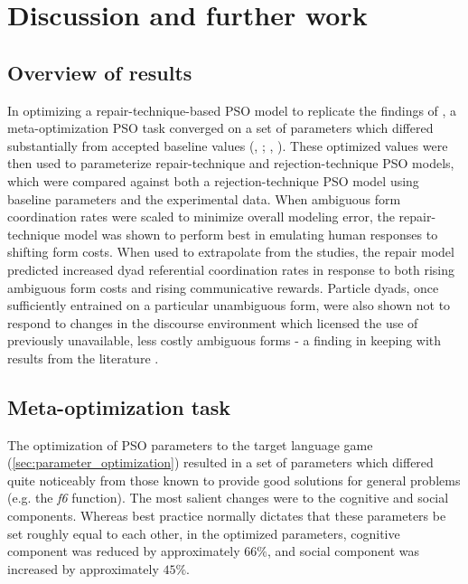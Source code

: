 \documentclass[11pt]{article}
\begin{document}
\section{Discussion and further work}
\subsection{Overview of results}
In optimizing a repair-technique-based PSO model to replicate the findings of \citeauthor{rohde2012}, a meta-optimization PSO task converged on a set of parameters which differed substantially from accepted baseline values (\citeauthor{shi1998}, \citeyear{shi1998}; \citeauthor{solnon2010}, \citeyear{solnon2010}). These optimized values were then used to parameterize repair-technique and rejection-technique PSO models, which were compared against both a rejection-technique PSO model using baseline parameters and the experimental data. When ambiguous form coordination rates were scaled to minimize overall modeling error, the repair-technique model was shown to perform best in emulating human responses to shifting form costs. When used to extrapolate from the \citeauthor{rohde2012} studies, the repair model predicted increased dyad referential coordination rates in response to both rising ambiguous form costs and rising communicative rewards. Particle dyads, once sufficiently entrained on a particular unambiguous form, were also shown not to respond to changes in the discourse environment which licensed the use of previously unavailable, less costly ambiguous forms - a finding in keeping with results from the literature \citep{brennan1996}.

\subsection{Meta-optimization task}
The optimization of PSO parameters to the target language game (\ref{sec:parameter_optimization}) resulted in a set of parameters which differed quite noticeably from those known to provide good solutions for general problems (e.g. the \textit{f6} function). The most salient changes were to the cognitive and social components. Whereas best practice normally dictates that these parameters be set roughly equal to each other, in the optimized parameters, cognitive component was reduced by approximately $66\%$, and social component was increased by approximately $45\%$. 
\end{document}
